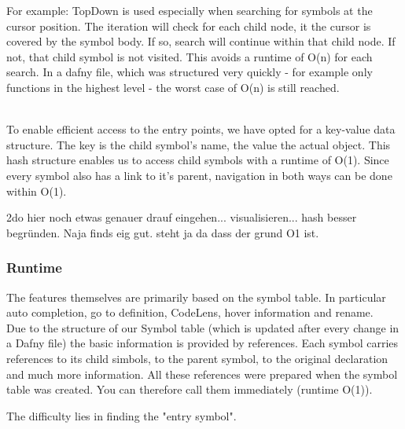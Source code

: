 For example: TopDown is used especially when searching for symbols at the cursor position.
The iteration will check for each child node, it the cursor is covered by the symbol body.
If so, search will continue within that child node.
If not, that child symbol is not visited.
This avoids a runtime of O(n) for each search. 
In a dafny file, which was structured very quickly - for example only functions in the highest level - the worst case of O(n) is still reached. 


 \\

To enable efficient access to the entry points, we have opted for a key-value data structure. The key is the child symbol's name, the value the actual  object.
This hash structure enables us to access child symbols with a runtime of O(1). Since every symbol also has a link to it's parent, navigation in both ways can be done within O(1).

2do hier noch etwas genauer drauf eingehen... visualisieren... hash besser begründen. Naja finds eig gut. steht ja da dass der grund O1 ist.

\subsubsection{Runtime}


The features themselves are primarily based on the symbol table.
In particular auto completion, go to definition, CodeLens, hover information and rename. \\

Due to the structure of our Symbol table (which is updated after every change in a Dafny file)
the basic information is provided by references.
Each symbol carries references to its child simbols, to the parent symbol, to the original declaration and much more information.
All these references were prepared when the symbol table was created. You can therefore call them immediately (runtime O(1)).  

The difficulty lies in finding the "entry symbol".

